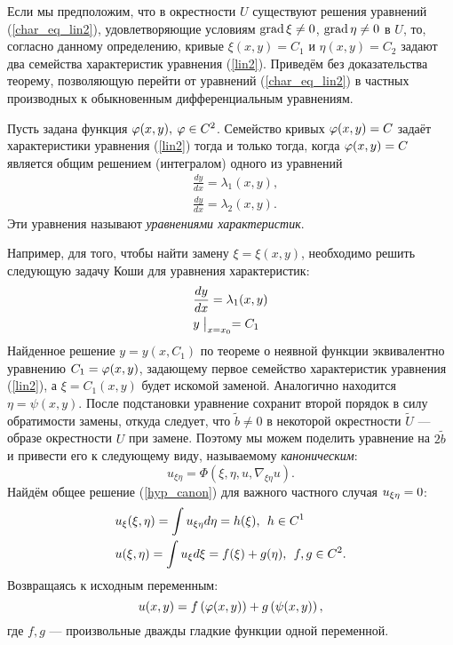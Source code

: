     Если мы предположим, что в окрестности $U$ существуют решения уравнений (\ref{char_eq_lin2}), удовлетворяющие условиям
    $\operatorname{grad} \xi \not= 0$, $\operatorname{grad} \eta \not= 0$ в $U$, то, согласно данному определению, кривые $\xi(x, y) = C_1$ и $\eta(x, y) = C_2$
    задают два семейства характеристик уравнения (\ref{lin2}). Приведём без доказательства теорему, позволяющую перейти от уравнений
    (\ref{char_eq_lin2}) в частных производных к обыкновенным дифференциальным уравнениям.
    \begin{theorem}
        Пусть задана функция $\varphi(x, y),\: \varphi \in C^2$. Семейство кривых $\varphi(x,y)=C$ задаёт характеристики уравнения (\ref{lin2}) тогда и
        только тогда, когда $\varphi(x, y) = C$ является общим решением (интегралом) одного из уравнений
        \begin{align*}
            & \frac{dy}{dx} = \lambda_1(x, y),\\
            & \frac{dy}{dx} = \lambda_2(x, y).
        \end{align*}
        Эти уравнения называют \textit{уравнениями характеристик}.
    \end{theorem}
    Например, для того, чтобы найти замену $\xi = \xi(x,y)$, необходимо решить следующую задачу Коши для уравнения характеристик:
    \begin{align*}
        & \frac{dy}{dx} = \lambda_1(x, y) \\
        & y \bigm|_{x = x_0} = C_1
    \end{align*}
    Найденное решение $y = y(x, C_1)$ по теореме о неявной функции эквивалентно уравнению $C_1 = \varphi(x, y)$, задающему первое семейство
    характеристик уравнения (\ref{lin2}), а $\xi = C_1(x, y)$ будет искомой заменой. Аналогично находится $\eta = \psi(x, y)$.
    После подстановки уравнение сохранит второй порядок в силу обратимости замены, откуда следует, что $\tilde{b} \not= 0$ в некоторой
    окрестности $\tilde{U}$ --- образе окрестности $U$ при замене. Поэтому мы можем поделить уравнение на $2\tilde{b}$ и привести его к
    следующему виду, называемому \textit{каноническим}:
    \begin{equation}
        u_{\xi\eta} = \Phi(\xi, \eta, u, \nabla_{\xi\eta}u). \label{hyp_canon}
    \end{equation}
    Найдём общее решение (\ref{hyp_canon}) для важного частного случая $u_{\xi\eta} = 0$:
    \begin{align*}
        & u_{\xi}(\xi, \eta) = \int u_{\xi\eta} d\eta = h(\xi), \:\: h \in C^1\\
        & u(\xi, \eta) = \int u_{\xi} d\xi = f(\xi) + g(\eta), \:\: f,g \in C^2.
    \end{align*}
    Возвращаясь к исходным переменным:
    \begin{equation}
        u(x, y) = f\left({\varphi(x,y)}\right) + g\left({\psi(x, y)}\right), \label{waveform_gen_sol}
    \end{equation}
    где $f,g$ --- произвольные дважды гладкие функции одной переменной.

